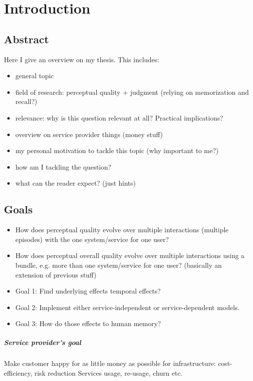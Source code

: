 \chapter{Introduction}
\section*{Abstract}
Here I give an overview on my thesis.
This includes:
\begin{itemize}
\item general topic
\item field of research: perceptual quality + judgment (relying on memorization and recall?)
\item relevance: why is this question relevant at all? Practical implications?
\item overview on service provider things (money stuff)
\item my personal motivation to tackle this topic (why important to me?)
\item how am I tackling the question?
\item what can the reader expect? (just hints)
\end{itemize}

\section{Goals}
\begin{itemize}
\item How does perceptual quality evolve over multiple interactions (multiple episodes) with the one system/service for one user?
\item How does perceptual overall quality evolve over multiple interactions using a bundle, e.g. more than one system/service for one user? (basically an extension of previous stuff)
\item Goal 1: Find underlying effects temporal effects? 
\item Goal 2: Implement either service-independent or service-dependent models.
\item Goal 3: How do those effects to human memory?
\end{itemize}


\paragraph*{Service provider's goal}
Make customer happy for as little money as possible for infrastructure: cost-efficiency, risk reduction
Services usage, re-usage, churn etc.

